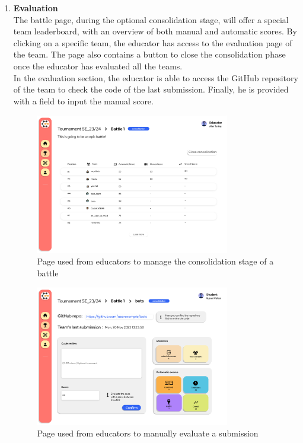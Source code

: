 \begin{enumerate}[label=\textbf{F\arabic*)}]
    \item \textbf{Evaluation}\\
    The battle page, during the optional consolidation stage, will offer a special team leaderboard, with an overview of both manual and automatic scores. By clicking on a specific team, the educator has access to the evaluation page of the team. The page also contains a button to close the consolidation phase once the educator has evaluated all the teams.\\
    In the evaluation section, the educator is able to access the GitHub repository of the team to check the code of the last submission. Finally, he is provided with a field to input the manual score.
    \begin{figure}[H]
        \centering
        \includegraphics[width=0.8\textwidth]{Mockups/16_educator_battle_consolidation.png}
        \caption{Page used from educators to manage the consolidation stage of a battle}
    \end{figure}
    \begin{figure}[H]
        \centering
        \includegraphics[width=0.8\textwidth]{Mockups/17_educator_manual.png}
        \caption{Page used from educators to manually evaluate a submission}
    \end{figure}
\end{enumerate}

